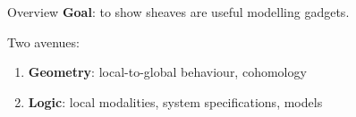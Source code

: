 \begin{frame}{Overview}
	\textbf{Goal}: to show sheaves are useful modelling gadgets.

	\vspace{5ex}

	Two avenues:
	\begin{enumerate}
		\item \textbf{Geometry}: local-to-global behaviour, cohomology
		\item \textbf{Logic}: local modalities, system specifications, models
	\end{enumerate}
\end{frame}
